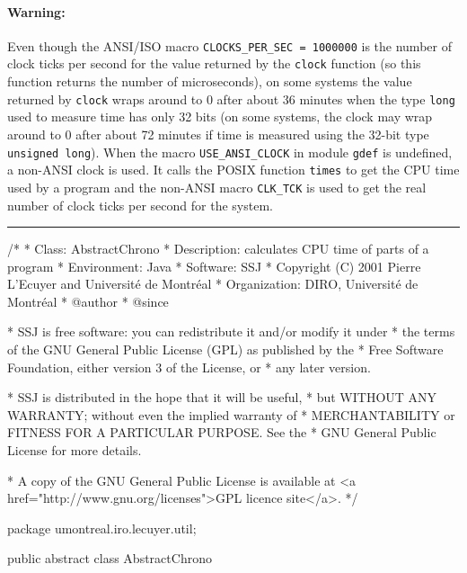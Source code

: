 \begin{latexonly}
\begin{hide}  %
\paragraph{Warning:}
  Even though the ANSI/ISO macro \texttt{CLOCKS\_PER\_SEC = 1000000}
  is the number of clock ticks per second for the value
  returned by the \texttt{clock} function (so this function returns the
  number of microseconds), on some systems the value returned by \texttt{clock}
  wraps around to 0 after about 36 minutes when the type \texttt{long}
  used to measure time has only 32 bits (on some systems, the clock may
  wrap around to 0 after about 72 minutes if time is
  measured using the 32-bit type \texttt{unsigned long}).
  When the macro \texttt{USE\_ANSI\_CLOCK} in module \texttt{gdef} is undefined,
  a non-ANSI clock is used. It calls the POSIX function
  \texttt{times} to get the CPU time used by a program and the
  non-ANSI macro \texttt{CLK\_TCK} is used to get the real number of
  clock ticks per second for the system.
\end{hide}   %

\end{latexonly}

\bigskip\hrule\bigskip
\begin{code}
\begin{hide}
/*
 * Class:        AbstractChrono
 * Description:  calculates CPU time of parts of a program
 * Environment:  Java
 * Software:     SSJ 
 * Copyright (C) 2001  Pierre L'Ecuyer and Université de Montréal
 * Organization: DIRO, Université de Montréal
 * @author       
 * @since

 * SSJ is free software: you can redistribute it and/or modify it under
 * the terms of the GNU General Public License (GPL) as published by the
 * Free Software Foundation, either version 3 of the License, or
 * any later version.

 * SSJ is distributed in the hope that it will be useful,
 * but WITHOUT ANY WARRANTY; without even the implied warranty of
 * MERCHANTABILITY or FITNESS FOR A PARTICULAR PURPOSE.  See the
 * GNU General Public License for more details.

 * A copy of the GNU General Public License is available at
   <a href="http://www.gnu.org/licenses">GPL licence site</a>.
 */
\end{hide}
package umontreal.iro.lecuyer.util;


public abstract class AbstractChrono\begin{hide} {

   private long m_second;
   private long m_microsec;
   private long[] now = new long[2];
   // tab[0] = seconds, tab[1] = microseconds

   protected abstract void getTime (long[] tab);
\end{hide}
\end{code}

